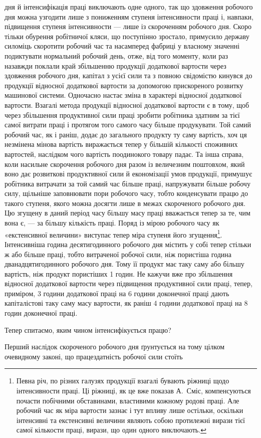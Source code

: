 \parcont{}  %
дня й інтенсифікація праці виключають одне одного, так що
здовження робочого дня можна узгодити лише з пониженням
ступеня інтенсивности праці і, навпаки, підвищення ступеня інтенсивности
— лише із скороченням робочого дня. Скоро тільки
обурення робітничої кляси, що поступінно зростало, примусило
державу силоміць скоротити робочий час та насамперед фабриці
у власному значенні подиктувати нормальний робочий день,
отже, від того моменту, коли раз назавжди поклали край збільшенню
продукції додаткової вартости через здовження робочого
дня, капітал з усієї сили та з повною свідомістю кинувся до продукції
відносної додаткової вартости за допомогою прискореного
розвитку машинової системи. Одночасно настає зміна в характері
відносної додаткової вартости. Взагалі метода продукції відносної
додаткової вартости є в тому, щоб через збільшення продуктивної
сили праці зробити робітника здатним за тієї самої витрати праці
і протягом того самого часу більше продукувати. Той самий
робочий час, як і раніш, додає до загального продукту ту саму
вартість, хоч ця незмінена мінова вартість виражається тепер у
більшій кількості споживних вартостей, наслідком чого вартість
поодинокого товару падає. Та інша справа, коли насильне скорочення
робочого дня разом із величезним поштовхом, який воно
дає розвиткові продуктивної сили й економізації умов продукції,
примушує робітника витрачати за той самий час більше праці,
напружувати більше робочу силу, щільніше заповнювати пори
робочого часу, тобто конденсувати працю до такого ступеня, якого
можна досягти лише в межах скороченого робочого дня. Цю
згущену в даний період часу більшу масу праці вважається тепер
за те, чим вона є, — за більшу кількість праці. Поряд із мірою
робочого часу як «екстенсивної величини» виступає тепер міра
ступеня його згущення\footnote{
Певна річ, по різних галузях продукції взагалі бувають ріжниці
щодо інтенсивности праці. Ці ріжниці, як це вже показав А.~Сміс, компенсуються
почасти побічними обставинами, властивими кожному родові
праці. Але робочий час як міра вартости зазнає і тут впливу лише остільки,
оскільки інтенсивні та екстенсивні величини являють собою протилежні
вирази тієї самої кількости праці, вирази, що один одного виключають.
}. Інтенсивніша година десятигодинного
робочого дня містить у собі тепер стільки ж або більше праці,
тобто витраченої робочої сили, ніж пористіша година дванадцятигодинного
робочого дня. Тому її продукт має таку саму або більшу
вартість, ніж продукт пористіших 1 годин. Не кажучи вже про
збільшення відносної додаткової вартости через підвищення продуктивної
сили праці, тепер, приміром, 3 години додаткової
праці на 6 години доконечної праці дають капіталістові таку
саму масу вартости, як раніш 4 години додаткової праці на 8 годин
доконечної праці.

Тепер спитаємо, яким чином інтенсифікується працю?

Перший наслідок скороченого робочого дня ґрунтується на тому
цілком очевидному законі, що працездатність робочої сили стоїть
\parbreak{}  %
